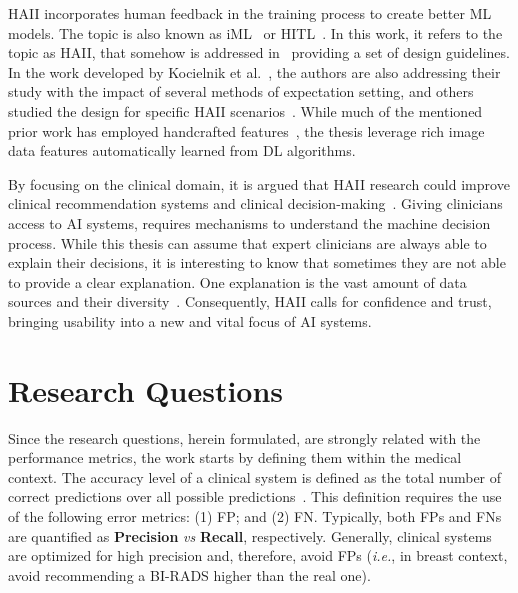 \ac{HAII} incorporates human feedback in the training process to create better \ac{ML} models.
The topic is also known as \ac{iML}~\cite{fails2003interactive} or \ac{HITL}~\cite{holzinger2016interactive}.
In this work, it refers to the topic as \ac{HAII}, that somehow is addressed in~\cite{10.1145/3290605.3300233} providing a set of design guidelines.
In the work developed by Kocielnik et al.~\cite{Kocielnik:2019:YAI:3290605.3300641}, the authors are also addressing their study with the impact of several methods of expectation setting, and others studied the design for specific \ac{HAII} scenarios~\cite{aha2017ai}.
While much of the mentioned prior work has employed handcrafted features~\cite{10.1145/3290605.3300233, Kocielnik:2019:YAI:3290605.3300641}, the thesis leverage rich image data features automatically learned from \ac{DL} algorithms.

By focusing on the clinical domain, it is argued that \ac{HAII} research could improve clinical recommendation systems and clinical decision-making~\cite{holzinger2019interactive}.
Giving clinicians access to \ac{AI} systems, requires mechanisms to understand the machine decision process.
While this thesis can assume that expert clinicians are always able to explain their decisions, it is interesting to know that sometimes they are not able to provide a clear explanation.
One explanation is the vast amount of data sources and their diversity~\cite{Bharadhwaj:2019:ERS:3308557.3308699, lau2018dataset, price2018big}.
Consequently, \ac{HAII} calls for confidence and trust, bringing usability into a new and vital focus of \ac{AI} systems.

\section{Research Questions}
\label{sec:app002003}

Since the research questions, herein formulated, are strongly related with the performance metrics, the work starts by defining them within the medical context.
The accuracy level of a clinical system is defined as the total number of correct predictions over all possible predictions~\cite{seref2019performance}.
This definition requires  the use of the following error metrics:
(1) \ac{FP}; and
(2) \ac{FN}.
Typically, both \acp{FP} and \acp{FN} are quantified as {\bf Precision} {\it vs} {\bf Recall}, respectively.
Generally, clinical systems are optimized for high precision and, therefore, avoid \acp{FP} ({\it i.e.}, in breast context, avoid recommending a \ac{BI-RADS} higher than the real one).

